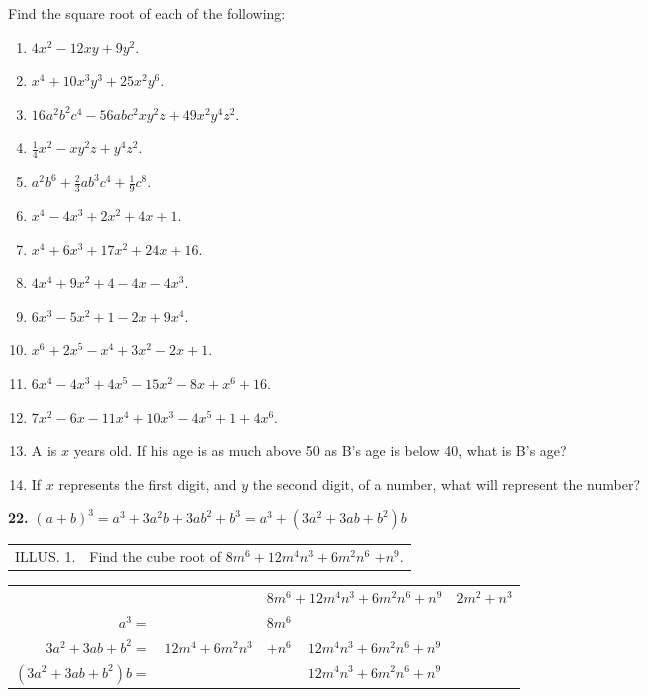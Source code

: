 \documentclass{book}
\begin{document}
Find the square root of each of the following:
\begin{enumerate}
\item $4x^2-12xy+9y^2$.

\item $x^4+10x^3y^3+25x^2y^6$.

\item $16a^2b^2c^4-56abc^2xy^2z+49x^2y^4z^2$.

\item $\frac{1}{4}x^2-xy^2z+y^4z^2$.

\item $a^2b^6+\frac{2}{3}ab^3c^4+\frac{1}{9}c^8$.

\item $x^4-4x^3+2x^2+4x+1$.

\item $x^4+6x^3+17x^2+24x+16$.

\item $4x^4+9x^2+4-4x-4x^3$.

\item $6x^3-5x^2+1-2x+9x^4$.

\item $x^6+2x^5-x^4+3x^2-2x+1$.

\item $6x^4-4x^3+4x^5-15x^2-8x+x^6+16$.

\item $7x^2-6x-11x^4+10x^3-4x^5+1+4x^6$.

\item A is $x$ years old. If his age is as much above 50 as B's
age is below 40, what is B's age?

\item If $x$ represents the first digit, and $y$ the second digit,
of a number, what will represent the number?
\end{enumerate}

\textbf{ 22.} $(a + b)^{3} = a^{3} + 3 a^{2} b + 3 a b^{2} + b^{3}
= a^{3} + (3 a^{2} + 3 a b + b^{2}) b$

\begin{center}
\begin{tabular}{ll}
ILLUS. 1. &Find the cube root of $8 m^{6} + 12 m^{4} n^{3} + 6
m^{2} n^{6}$ $+ n^{9}$.\\
\end{tabular}
\end{center}

\begin{tabular}{rclcc}
&& \multicolumn{2}{l|}{$\scriptstyle 8m^6+12m^4 n^3 +6m^2 n^6 + n^9$} &$\scriptstyle 2m^2 + n^3$ \\
\cline{5-5}
$\scriptstyle a^3=$ &&\multicolumn{2}{l|}{$\scriptstyle 8m^6$}\\
\cline{3-4}
$\scriptstyle 3a^2+3ab+b^2=$&$\scriptstyle 12m^4+6m^2n^3$&$\scriptstyle +n^6 $&\multicolumn{1}{|c}{$\scriptstyle 12m^4 n^3 +6m^2 n^6 +n^9$}\\
$\scriptstyle
(3a^2+3ab+b^2)b=$&&&\multicolumn{1}{|c}{$\scriptstyle 12m^4 n^3
+6m^2 n^6
+n^9$}\\
 \cline{4-4}
\end{tabular}
\end{document}
